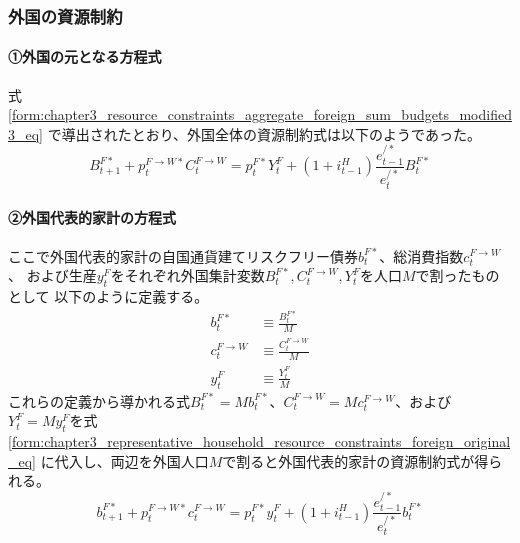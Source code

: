 \subsubsection{外国の資源制約}
\label{sec:chapter3_representative_household_resource_constraints_foreign}

\paragraph{①外国の元となる方程式}
\label{sec:chapter3_representative_household_resource_constraints_foreign_original}
式
\eqref{form:chapter3_resource_constraints_aggregate_foreign_sum_budgets_modified3_eq}
で導出されたとおり、外国全体の資源制約式は以下のようであった。
\begin{equation}
\label{form:chapter3_representative_household_resource_constraints_foreign_original_eq}
    B_{t+1}^{F*}+p_t^{F\to W*}C_t^{F\to W}=p_t^{F*}Y_t^F+(1+i_{t-1}^H)\frac{e_{t-1}^{/*}}{e_t^{/*}}B_t^{F*}
\end{equation}

\paragraph{②外国代表的家計の方程式}
\label{sec:chapter3_representative_household_resource_constraints_foreign_representative}
ここで外国代表的家計の自国通貨建てリスクフリー債券\(b_t^{F*}\)、総消費指数\(c_t^{F\to W}\)、
および生産\(y_t^F\)をそれぞれ外国集計変数\(B_t^{F*}, C_t^{F\to W}, Y_t^F\)を人口\(M\)で割ったものとして
以下のように定義する。
\begin{align}
    \label{form:chapter3_representative_household_resource_constraints_foreign_b_F_star_def}
        b_t^{F*}&\equiv\frac{B_t^{F*}}{M} \\
    \label{form:chapter3_representative_household_resource_constraints_foreign_c_F_W_def}
        c_t^{F\to W}&\equiv\frac{C_t^{F\to W}}{M} \\
    \label{form:chapter3_representative_household_resource_constraints_foreign_y_F_def}
        y_t^F&\equiv\frac{Y_t^F}{M}
\end{align}
これらの定義から導かれる式\(B_t^{F*}=Mb_t^{F*}\)、\(C_t^{F\to W}=Mc_t^{F\to W}\)、および\(Y_t^F=My_t^F\)を式
\eqref{form:chapter3_representative_household_resource_constraints_foreign_original_eq}
に代入し、両辺を外国人口\(M\)で割ると外国代表的家計の資源制約式が得られる。
\begin{equation}
\label{form:chapter3_representative_household_resource_constraints_foreign_representative_eq}
    b_{t+1}^{F*}+p_t^{F\to W*}c_t^{F\to W}=p_t^{F*}y_t^F+(1+i_{t-1}^H)\frac{e_{t-1}^{/*}}{e_t^{/*}}b_t^{F*}
\end{equation}